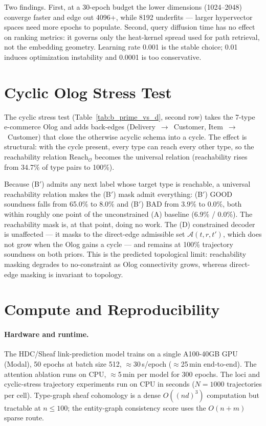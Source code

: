 Two findings. First, at a 30-epoch budget the lower dimensions
(1024--2048) converge faster and edge out 4096+, while 8192 underfits ---
larger hypervector spaces need more epochs to populate. Second, query
diffusion time has no effect on ranking metrics: it governs only the
heat-kernel spread used for path retrieval, not the embedding geometry.
Learning rate 0.001 is the stable choice; 0.01 induces optimization
instability and 0.0001 is too conservative.

\section{Cyclic Olog Stress Test}
\label{app:cyclic}

The cyclic stress test (Table~\ref{tab:b_prime_vs_d}, second row) takes
the 7-type e-commerce Olog and adds back-edges
(Delivery~$\to$~Customer, Item~$\to$~Customer) that close the otherwise
acyclic schema into a cycle. The effect is structural: with the cycle
present, every type can reach every other type, so the reachability
relation $\mathrm{Reach}_\mathcal{O}$ becomes the universal relation
(reachability rises from 34.7\% of type pairs to 100\%).

Because (B$'$) admits any next label whose target type is reachable, a
universal reachability relation makes the (B$'$) mask admit everything:
(B$'$) GOOD soundness falls from 65.0\% to 8.0\% and (B$'$) BAD from
3.9\% to 0.0\%, both within roughly one point of the unconstrained (A)
baseline (6.9\% / 0.0\%). The reachability mask is, at that point, doing
no work. The (D) constrained decoder is unaffected --- it masks to the
direct-edge admissible set $\mathcal{A}(t,r,t')$, which does not grow
when the Olog gains a cycle --- and remains at 100\% trajectory
soundness on both priors. This is the predicted topological limit:
reachability masking degrades to no-constraint as Olog connectivity
grows, whereas direct-edge masking is invariant to topology.

\section{Compute and Reproducibility}
\label{app:compute}

\paragraph{Hardware and runtime.} The HDC/Sheaf link-prediction model
trains on a single A100-40GB GPU (Modal), 50 epochs at batch size 512,
$\approx$30\,s/epoch ($\approx$25\,min end-to-end). The attention
ablation runs on CPU, $\approx$5\,min per model for 300 epochs. The loci
and cyclic-stress trajectory experiments run on CPU in seconds
($N=1000$ trajectories per cell). Type-graph sheaf cohomology is a
dense $O((nd)^3)$ computation but tractable at $n \leq 100$; the
entity-graph consistency score uses the $O(n+m)$ sparse route.

